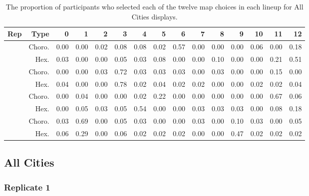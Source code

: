 \documentclass{monashthesis}
\begin{document}
\begin{table}

\caption{\label{tab:choice-all}The proportion of participants who selected each of the twelve map choices in each lineup for All Cities displays.}
\centering
\begin{tabular}[t]{rrrrrrrrrrrrrrr}
\toprule
Rep & Type & 0 & 1 & 2 & 3 & 4 & 5 & 6 & 7 & 8 & 9 & 10 & 11 & 12\\
\midrule
 & Choro. & 0.00 & 0.00 & 0.02 & 0.08 & 0.08 & 0.02 & 0.57 & 0.00 & 0.00 & 0.00 & 0.06 & 0.00 & 0.18\\
\cmidrule{2-15}
\multirow{-2}{*}{\raggedleft\arraybackslash 1} & Hex. & 0.03 & 0.00 & 0.00 & 0.05 & 0.03 & 0.08 & 0.00 & 0.00 & 0.10 & 0.00 & 0.00 & 0.21 & 0.51\\
\cmidrule{1-15}
 & Choro. & 0.00 & 0.00 & 0.03 & 0.72 & 0.03 & 0.03 & 0.03 & 0.00 & 0.03 & 0.00 & 0.00 & 0.15 & 0.00\\
\cmidrule{2-15}
\multirow{-2}{*}{\raggedleft\arraybackslash 2} & Hex. & 0.04 & 0.00 & 0.00 & 0.78 & 0.02 & 0.04 & 0.02 & 0.02 & 0.00 & 0.00 & 0.02 & 0.02 & 0.04\\
\cmidrule{1-15}
 & Choro. & 0.00 & 0.04 & 0.00 & 0.00 & 0.02 & 0.22 & 0.00 & 0.00 & 0.00 & 0.00 & 0.00 & 0.67 & 0.06\\
\cmidrule{2-15}
\multirow{-2}{*}{\raggedleft\arraybackslash 3} & Hex. & 0.00 & 0.05 & 0.03 & 0.05 & 0.54 & 0.00 & 0.00 & 0.03 & 0.03 & 0.03 & 0.00 & 0.08 & 0.18\\
\cmidrule{1-15}
 & Choro. & 0.03 & 0.69 & 0.00 & 0.05 & 0.03 & 0.00 & 0.00 & 0.03 & 0.00 & 0.10 & 0.03 & 0.00 & 0.05\\
\cmidrule{2-15}
\multirow{-2}{*}{\raggedleft\arraybackslash 4} & Hex. & 0.06 & 0.29 & 0.00 & 0.06 & 0.02 & 0.02 & 0.02 & 0.00 & 0.00 & 0.47 & 0.02 & 0.02 & 0.02\\
\bottomrule
\end{tabular}
\end{table}

\newpage

\hypertarget{all-cities}{%
\subsection{All Cities}\label{all-cities}}

\hypertarget{replicate-1}{%
\subsubsection{Replicate 1}\label{replicate-1}}
\end{document}

